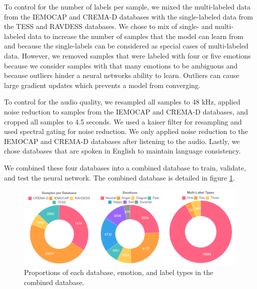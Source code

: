 \documentclass[conference]{IEEEtran}
\begin{document}
To control for the number of labels per sample, we mixed the multi-labeled data from the IEMOCAP and CREMA-D databases with the single-labeled data from the TESS and RAVDESS databases. We chose to mix of single- and multi- labeled data to increase the number of samples that the model can learn from and because the single-labels can be considered as special cases of multi-labeled data. However, we removed samples that were labeled with four or five emotions because we consider samples with that many emotions to be ambiguous and because outliers hinder a neural networks ability to learn. Outliers can cause large gradient updates which prevents a model from converging.

To control for the audio quality, we resampled all samples to 48 kHz, applied noise reduction to samples from the IEMOCAP and CREMA-D databases, and cropped all samples to 4.5 seconds. We used a kaiser filter for resampling and used spectral gating for noise reduction. We only applied noise reduction to the IEMOCAP and CREMA-D databases after listening to the audio. Lastly, we chose databases that are spoken in English to maintain language consistency.

We combined these four databases into a combined database to train, validate, and test the neural network. The combined database is detailed in figure \ref{combinedDb}.

\begin{figure}[t]
	\centering
	\hspace{6mm}
	\includegraphics[width=\textwidth]{combined_db.png} 
	\caption{Proportions of each database, emotion, and label types in the combined database.}
	\label{combinedDb}
\end{figure}
\end{document}
